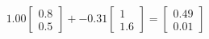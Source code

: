 \documentclass[preview]{standalone}
\begin{document}
\begin{align*}
1.00 \begin{bmatrix} 0.8 \\ 0.5 \end{bmatrix} + -0.31 \begin{bmatrix} 1 \\ 1.6 \end{bmatrix} = \begin{bmatrix} 0.49 \\ 0.01 \end{bmatrix}
\end{align*}
\end{document}
